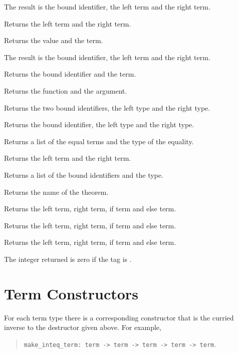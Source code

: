  The result
is the bound identifier, the left term and the right term.

 Returns the left term
and the right term.

 Returns the value
and the term.

 The
result is the bound identifier, the left term and the right term.

  Returns the
bound identifier and the term.

  Returns the
function and the argument.

Returns the two bound identifiers, the left type and the right type.

  Returns the
bound identifier, the left type and the right type.



 Returns a list
of the equal terms and the type of the equality.

 Returns the
left term and the right term.

 Returns a
list of the bound identifiers and the type.

 Returns the name of the
theorem.

Returns the left term, right term, if term and else term.

Returns the left term, right term, if term and else term.

Returns the left term, right term, if term and else term.

The integer returned is zero if the tag is {\tt *}.



\section{Term Constructors}
For each term type there is a corresponding constructor that is the
curried inverse to the destructor given above.  For example,
\begin{quote}
{\tt make\_inteq\_term: term -> term -> term -> term -> term}.
\end{quote}








